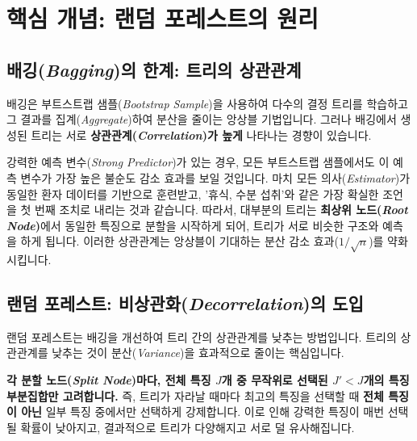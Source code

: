 \documentclass[11pt,a4paper]{book}
\theoremstyle{definition}
\begin{document}
\section{핵심 개념: 랜덤 포레스트의 원리}

\subsection{배깅(\emph{Bagging})의 한계: 트리의 상관관계}

배깅은 부트스트랩 샘플(\emph{Bootstrap Sample})을 사용하여 다수의 결정 트리를 학습하고 그 결과를 집계(\emph{Aggregate})하여 분산을 줄이는 앙상블 기법입니다.
그러나 배깅에서 생성된 트리는 서로 \textbf{상관관계(\emph{Correlation})가 높게} 나타나는 경향이 있습니다.

\begin{tcolorbox}[examplebox, title={상관관계가 높은 이유에 대한 비유}]
강력한 예측 변수(\emph{Strong Predictor})가 있는 경우, 모든 부트스트랩 샘플에서도 이 예측 변수가 가장 높은 불순도 감소 효과를 보일 것입니다.
마치 모든 의사(\emph{Estimator})가 동일한 환자 데이터를 기반으로 훈련받고, '휴식, 수분 섭취'와 같은 가장 확실한 조언을 첫 번째 조치로 내리는 것과 같습니다.
따라서, 대부분의 트리는 \textbf{최상위 노드(\emph{Root Node})}에서 동일한 특징으로 분할을 시작하게 되어, 트리가 서로 비슷한 구조와 예측을 하게 됩니다.
이러한 상관관계는 앙상블이 기대하는 분산 감소 효과($1/\sqrt{n}$)를 약화시킵니다.
\end{tcolorbox}

\subsection{랜덤 포레스트: 비상관화(\emph{Decorrelation})의 도입}

랜덤 포레스트는 배깅을 개선하여 트리 간의 상관관계를 낮추는 방법입니다.
트리의 상관관계를 낮추는 것이 분산(\emph{Variance})을 효과적으로 줄이는 핵심입니다.

\begin{tcolorbox}[infobox, title={랜덤 포레스트의 핵심 아이디어}]
\textbf{각 분할 노드(\emph{Split Node})마다, 전체 특징 $J$개 중 무작위로 선택된 $J' < J$개의 특징 부분집합만 고려합니다.}
즉, 트리가 자라날 때마다 최고의 특징을 선택할 때 \textbf{전체 특징이 아닌} 일부 특징 중에서만 선택하게 강제합니다.
이로 인해 강력한 특징이 매번 선택될 확률이 낮아지고, 결과적으로 트리가 다양해지고 서로 덜 유사해집니다.
\end{tcolorbox}
\end{document}
